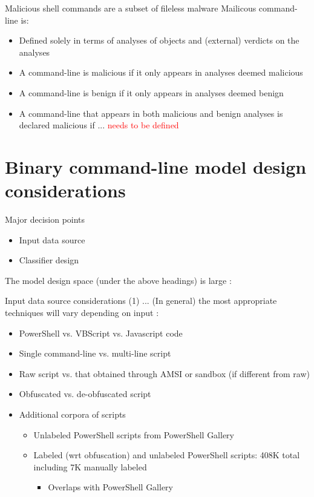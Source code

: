 \documentclass[10pt]{beamer}
\begin{document}
\begin{frame}{Malicious shell commands are a subset of fileless malware}
	Mailicous command-line is:
	\begin{itemize}
		\item Defined solely in terms of analyses of objects and (external) verdicts on the analyses
		\item A command-line is malicious if it only appears in analyses deemed malicious
		\item A command-line is benign if it only appears in analyses deemed benign
		\item A command-line that appears in both malicious and benign analyses is declared malicious if ... \textcolor{red}{needs to be defined}
	\end{itemize}
\end{frame}

\section{Binary command-line model design considerations}

\begin{frame}[fragile]{Major decision points}
	\begin{itemize}
		\item Input data source
		\item Classifier design
	\end{itemize}

	The model design space (under the above headings) is large \cite{survey2021,msft2017,powershell2018,amsi2019,feye2018,feye2018-2,charcnn2016,charcnn2019,transformers2019}:
\end{frame}

\begin{frame}{Input data source considerations (1) ...}
	(In general) the most appropriate techniques will vary depending on input \cite{msft2017-2,msft2019,feye2018}:
	\begin{itemize}
		\item PowerShell vs. VBScript vs. Javascript code 
		\item Single command-line vs. multi-line script
		\item Raw script vs. that obtained through AMSI or sandbox (if different from raw)
		\item Obfuscated vs. de-obfuscated script
		\item Additional corpora of scripts
		\begin{itemize}
			\item Unlabeled PowerShell scripts from PowerShell Gallery \cite{data1}
			\item Labeled (wrt obfuscation) and unlabeled PowerShell scripts: 408K total including 7K manually labeled \cite{data21,data22}
			\begin {itemize}
				\item Overlaps with PowerShell Gallery
			\end {itemize}
		\end{itemize}
	\end{itemize}
\end{frame}
\end{document}
